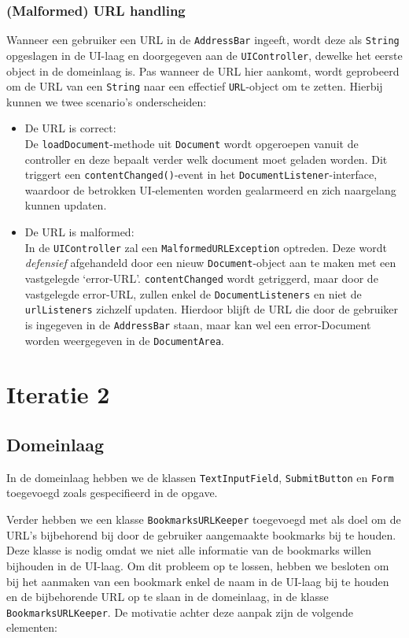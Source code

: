 \documentclass[12pt]{article}
\begin{document}
\subsubsection{(Malformed) URL handling}
Wanneer een gebruiker een URL in de \texttt{AddressBar} ingeeft, wordt deze als \texttt{String} opgeslagen in de UI-laag en doorgegeven aan de \texttt{UIController}, dewelke het eerste object in de domeinlaag is. Pas wanneer de URL hier aankomt, wordt geprobeerd om de URL van een \texttt{String} naar een effectief \texttt{URL}-object om te zetten. Hierbij kunnen we twee scenario's onderscheiden:
\begin{itemize}
	\item De URL is correct:\\
	De \texttt{loadDocument}-methode uit \texttt{Document} wordt opgeroepen vanuit de controller en deze bepaalt verder welk document moet geladen worden. Dit triggert een \texttt{contentChanged()}-event in het \texttt{DocumentListener}-interface, waardoor de betrokken UI-elementen worden gealarmeerd en zich naargelang kunnen updaten.
	\item De URL is malformed:\\
	In de \texttt{UIController} zal een \texttt{MalformedURLException} optreden. Deze wordt \textit{defensief} afgehandeld door een nieuw \texttt{Document}-object aan te maken met een vastgelegde `error-URL'. \texttt{contentChanged} wordt getriggerd, maar door de vastgelegde error-URL, zullen enkel de \texttt{DocumentListeners} en niet de \texttt{urlListeners} zichzelf updaten. Hierdoor blijft de URL die door de gebruiker is ingegeven in de \texttt{AddressBar} staan, maar kan wel een error-Document worden weergegeven in de \texttt{DocumentArea}.
\end{itemize}

\newpage
\section{Iteratie 2}

\subsection{Domeinlaag}
In de domeinlaag hebben we de klassen \texttt{TextInputField}, \texttt{SubmitButton} en \texttt{Form} toegevoegd zoals gespecifieerd in de opgave. 

Verder hebben we een klasse \texttt{BookmarksURLKeeper} toegevoegd met als doel om de URL's bijbehorend bij door de gebruiker aangemaakte bookmarks bij te houden. Deze klasse is nodig omdat we niet alle informatie van de bookmarks willen bijhouden in de UI-laag. Om dit probleem op te lossen, hebben we besloten om bij het aanmaken van een bookmark enkel de naam in de UI-laag bij te houden en de bijbehorende URL op te slaan in de domeinlaag, in de klasse \texttt{BookmarksURLKeeper}. De motivatie achter deze aanpak zijn de volgende elementen:
\end{document}
